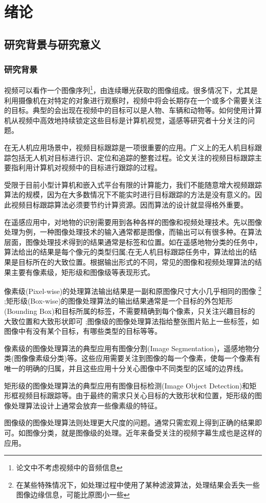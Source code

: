 
\chapter{绪论}

\section{研究背景与研究意义}
\subsection{研究背景}

视频可以看作一个图像序列\footnote{论文中不考虑视频中的音频信息}，由连续曝光获取的图像组成。很多情况下，尤其是利用摄像机在对特定的对象进行观察时，视频中将会长期存在一个或多个需要关注的目标。典型的会出现在视频中的目标可以是人物、车辆和动物等。如何使用计算机从视频中高效地持续锁定这些目标是计算机视觉，遥感等研究者十分关注的问题。
\par
在无人机应用场景中，视频目标跟踪是一项很重要的应用。广义上的无人机目标跟踪包括无人机对目标进行识、定位和追踪的整套过程。论文关注的视频目标跟踪主要指利用计算机对视频中的目标进行跟踪的过程。
\par
受限于目前小型计算机和嵌入式平台有限的计算能力，我们不能随意增大视频跟踪算法的规模，因为在大多数情况下不能实时进行目标跟踪的方法是没有意义的。因此视频目标跟踪算法必须要节约计算资源。因而算法的设计就显得格外重要。
\par
在遥感应用中，对地物的识别需要用到各种各样的图像和视频处理技术。先以图像处理为例，一种图像处理技术的输入通常都是图像，而输出可以有很多种。在算法层面，图像处理技术得到的结果通常是标签和位置。如在遥感地物分类的任务中，算法给出的结果是每个像元的类型归属;在无人机目标跟踪任务中，算法给出的结果是目标所在的大致位置。根据输出形式的不同，常见的图像和视频处理算法的结果主要有像素级，矩形级和图像级等表现形式。
\par
像素级(Pixel-wise)的处理算法输出结果是一副和原图像尺寸大小几乎相同的图像
\footnote{在某些特殊情况下，如处理过程中使用了某种滤波算法，处理结果会丢失一些图像边缘信息，可能比原图小一些}
;矩形级(Box-wise)的图像处理算法的输出结果通常是一个目标的外包矩形(Bounding Box)和目标所属的标签，不需要精确到每个像素，只关注兴趣目标的大致位置和大致形状即可
;图像级的图像处理算法指给整张图片贴上一些标签，如图像中有没有某个目标，有哪些类型的目标等等。
\par
像素级的图像处理算法的典型应用有图像分割(Image Segmentation)，遥感地物分类(图像像素级分类)等。这些应用需要关注到图像的每一个像素，使每一个像素有唯一的明确的归属，并且这些应用十分关心图像中不同类型的区域的边界线。
\par
矩形级的图像处理算法的典型应用有图像目标检测(Image Object Detection)和矩形框视频目标跟踪等。由于最终的需求只关心目标的大致形状和位置，矩形级的图像处理算法设计上通常会放弃一些像素级的特征。
\par
图像级的图像处理算法则处理更大尺度的问题。通常只需宏观上得到正确的结果即可。如图像分类\supercite{imagenet_cvpr09}，就是图像级的处理。近年来备受关注的视频字幕生成\supercite{aswin2019nlp}也是这样的应用。

